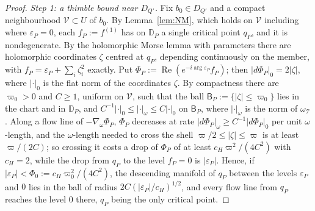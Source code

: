 \begin{proof}
\emph{Step 1: a thimble bound near $D_{Q'}$.} Fix $b_0\in D_{Q'}$ and a compact neighbourhood $\mathcal V\subset U$ of
$b_0$. By Lemma~\ref{lem:NM}, which holds on $\mathcal V$ including where $\varepsilon_P=0$, each $f_P:=f^{(1)}$ has on
$\mathbb D_P$ a single critical point $q_P$, and it is nondegenerate. By the holomorphic Morse lemma with parameters
\cite[\S\S6.2, 9.6]{AGZV1} there are holomorphic coordinates $\zeta$ centred at $q_P$, depending continuously on the member, with
$f_P=\varepsilon_P+\sum_i\zeta_i^2$ exactly. Put $\Phi_P:=\operatorname{Re}(e^{-i\arg\varepsilon_P}f_P)$; then $|d\Phi_P|_0=2|\zeta|$,
where $|\cdot|_0$ is the flat norm of the coordinates $\zeta$. By compactness there are $\varpi_0>0$ and $C\ge1$, uniform on
$\mathcal V$, such that the ball $\mathsf B_P:=\{|\zeta|\le\varpi_0\}$ lies in the chart and in $\mathbb D_P$, and
$C^{-1}|\cdot|_0\le|\cdot|_\omega\le C|\cdot|_0$ on $\mathsf B_P$, where $|\cdot|_\omega$ is the norm of
$\omega_{\mathcal T}$. Along a flow line of $-\nabla_\omega\Phi_P$, $\Phi_P$ decreases at rate $|d\Phi_P|_\omega\ge C^{-1}|d\Phi_P|_0$ per unit
$\omega$-length, and the $\omega$-length needed to cross the shell $\varpi/2\le|\zeta|\le\varpi$ is at least $\varpi/(2C)$;
so crossing it costs a drop of $\Phi_P$ of at least $c_H\varpi^2/(4C^2)$ with $c_H=2$, while the drop from $q_P$ to the level
$f_P=0$ is $|\varepsilon_P|$. Hence, if $|\varepsilon_P|<\Phi_0:=c_H\varpi_0^2/(4C^2)$, the descending manifold of $q_P$ between
the levels $\varepsilon_P$ and $0$ lies in the ball of radius $2C(|\varepsilon_P|/c_H)^{1/2}$, and every flow line from $q_P$
reaches the level $0$ there, $q_P$ being the only critical point.


\end{proof}
